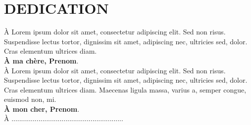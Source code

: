 \chapter*{DEDICATION}
\thispagestyle{MyStyle}
%
\begin{center}
{\huge À} Lorem ipsum dolor sit amet, consectetur adipiscing elit. Sed non risus. Suspendisse lectus tortor, dignissim sit amet, adipiscing nec, ultricies sed, dolor. Cras elementum ultrices diam.\\ 
\textbf{À ma chère, Prenom}.\\
{\huge À} Lorem ipsum dolor sit amet, consectetur adipiscing elit. Sed non risus. Suspendisse lectus tortor, dignissim sit amet, adipiscing nec, ultricies sed, dolor. Cras elementum ultrices diam. Maecenas ligula massa, varius a, semper congue, euismod non, mi. \\
\textbf{À mon cher, Prenom}.\\
{\huge À} ..........................................................
\end{center}
